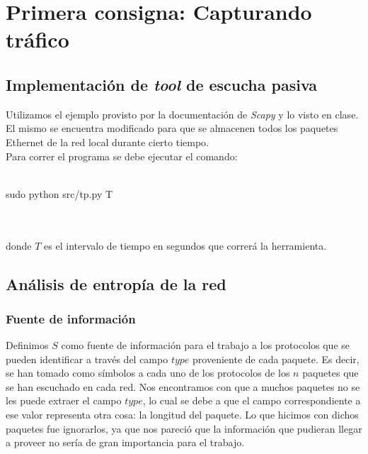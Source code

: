 \section{Primera consigna: Capturando tráfico}

\subsection{Implementación de \emph{tool} de escucha pasiva}
Utilizamos el ejemplo provisto por la documentación de \emph{Scapy} y lo visto en clase. 
El mismo se encuentra modificado para que se almacenen todos los paquetes Ethernet de la red local durante cierto tiempo. \\

Para correr el programa se debe ejecutar el comando: \\ \\ \centerline{sudo python src/tp.py T} \\ \\ donde $T$ es el intervalo de tiempo en segundos 
que correrá la herramienta.

\subsection{Análisis de entropía de la red}

\subsubsection{Fuente de información}
Definimos $S$ como fuente de información para el trabajo a los protocolos que se pueden identificar a través del campo $type$ 
proveniente de cada paquete. Es decir, se han tomado como símbolos a cada uno de los protocolos de los $n$ paquetes que se han escuchado en cada red. Nos encontramos con que a muchos paquetes no se les puede extraer el campo $type$, lo cual se debe a que
el campo correspondiente a ese valor representa otra cosa: la longitud del paquete. Lo que hicimos con dichos paquetes fue
ignorarlos, ya que nos pareció que la información que pudieran llegar a proveer no sería de gran importancia para el trabajo. \\

